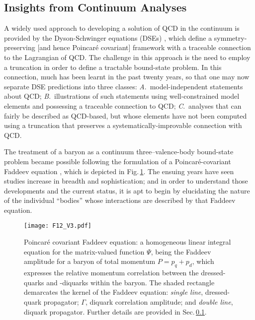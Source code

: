 
\subsection{Insights from Continuum Analyses}
\label{sec:continuumQCD}
%
A widely used approach to developing a solution of QCD in the continuum is provided by the Dyson-Schwinger equations (DSEs) \cite{Roberts:1994dr, Chang:2011vu, Bashir:2012fs, Roberts:2015lja, Horn:2016rip, Eichmann:2016yit}, which define a symmetry-preserving [and hence Poincar\'e covariant] framework with a traceable connection to the Lagrangian of QCD.
%
The challenge in this approach is the need to employ a truncation in order to define a tractable bound-state problem.  %
%
In this connection, much has been learnt in the past twenty years, so that one may now separate DSE predictions into three classes:
%
\emph{A}.\ model-independent statements about QCD;
%
\emph{B}.\ illustrations of such statements using well-constrained model elements and possessing a traceable connection to QCD;
%
\emph{C}.\ analyses that can fairly be described as QCD-based, but whose elements have not been computed using a truncation that preserves a systematically-improvable connection with QCD.

The treatment of a baryon as a continuum three--valence-body bound-state problem became possible following the formulation of a Poincar\'e-covariant Faddeev equation \cite{Cahill:1988dx, Burden:1988dt, Cahill:1988zi, Reinhardt:1989rw, Efimov:1990uz}, which is depicted in Fig.\,\ref{figFaddeev}.  The ensuing years have seen studies increase in breadth and sophistication; and in order to understand those developments and the current status, it is apt to begin by elucidating the nature of the individual ``bodies'' whose interactions are described by that Faddeev equation.

\begin{figure}[t]
\centerline{%
\texttt{[image: F12\_V3.pdf]}}
\caption{\label{figFaddeev}
Poincar\'e covariant Faddeev equation: a homogeneous linear integral equation for the matrix-valued function $\Psi$, being the Faddeev amplitude for a baryon of total momentum $P= p_q + p_d$, which expresses the relative momentum correlation between the dressed-quarks and -diquarks within the baryon.  The shaded rectangle demarcates the kernel of the Faddeev equation: \emph{single line}, dressed-quark propagator; $\Gamma$,  diquark correlation amplitude; and \emph{double line}, diquark propagator.  Further details are provided in Sec.\,\ref{sec:continuumQCD}.}
\end{figure}

